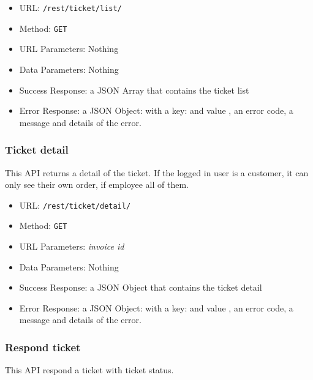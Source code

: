 \begin{itemize}
    \item URL: \texttt{/rest/ticket/list/}
    \item Method: \texttt{GET}
    \item URL Parameters: Nothing
    \item Data Parameters: Nothing
    \item Success Response:  a JSON Array that contains the ticket list
    \item Error Response: a JSON Object: with a key:   and value , an error code, a message and details of the error.
\end{itemize}

\subsubsection*{Ticket detail}

This API returns a detail of the ticket.
If the logged in user is a customer, it can only see their own order, if employee all of them.

\begin{itemize}
    \item URL: \texttt{/rest/ticket/detail/}
    \item Method: \texttt{GET}
    \item URL Parameters: \textit{invoice id}
    \item Data Parameters: Nothing
    \item Success Response: a JSON Object that contains the ticket detail
    \item Error Response: a JSON Object: with a key:   and value , an error code, a message and details of the error.
\end{itemize}


\subsubsection*{Respond ticket}

This API respond a ticket with ticket status.

